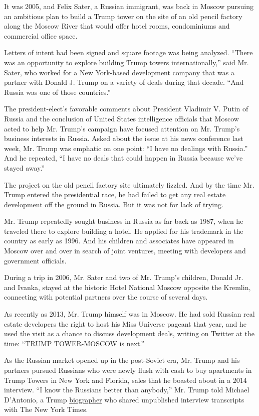 It was 2005, and Felix Sater, a Russian immigrant, was back in Moscow
pursuing an ambitious plan to build a Trump tower on the site of an old
pencil factory along the Moscow River that would offer hotel rooms,
condominiums and commercial office space.

Letters of intent had been signed and square footage was being analyzed.
``There was an opportunity to explore building Trump towers
internationally,'' said Mr. Sater, who worked for a New York-based
development company that was a partner with Donald J. Trump on a variety
of deals during that decade. ``And Russia was one of those countries.''

The president-elect's favorable comments about President Vladimir V.
Putin of Russia and the conclusion of United States intelligence
officials that Moscow acted to help Mr. Trump's campaign have focused
attention on Mr. Trump's business interests in Russia. Asked about the
issue at his news conference last week, Mr. Trump was emphatic on one
point: ``I have no dealings with Russia.'' And he repeated, ``I have no
deals that could happen in Russia because we've stayed away.''

The project on the old pencil factory site ultimately fizzled. And by
the time Mr. Trump entered the presidential race, he had failed to get
any real estate development off the ground in Russia. But it was not for
lack of trying.

Mr. Trump repeatedly sought business in Russia as far back as 1987, when
he traveled there to explore building a hotel. He applied for his
trademark in the country as early as 1996. And his children and
associates have appeared in Moscow over and over in search of joint
ventures, meeting with developers and government officials.

During a trip in 2006, Mr. Sater and two of Mr. Trump's children, Donald
Jr. and Ivanka, stayed at the historic Hotel National Moscow opposite
the Kremlin, connecting with potential partners over the course of
several days.

As recently as 2013, Mr. Trump himself was in Moscow. He had sold
Russian real estate developers the right to host his Miss Universe
pageant that year, and he used the visit as a chance to discuss
development deals, writing on Twitter at the time: ``TRUMP TOWER-MOSCOW
is next.''

As the Russian market opened up in the post-Soviet era, Mr. Trump and
his partners pursued Russians who were newly flush with cash to buy
apartments in Trump Towers in New York and Florida, sales that he
boasted about in a 2014 interview. ``I know the Russians better than
anybody,'' Mr. Trump told Michael D'Antonio, a Trump
\href{http://www.michaeldantonio.net/?page_id=160}{biographer} who
shared unpublished interview transcripts with The New York Times.

